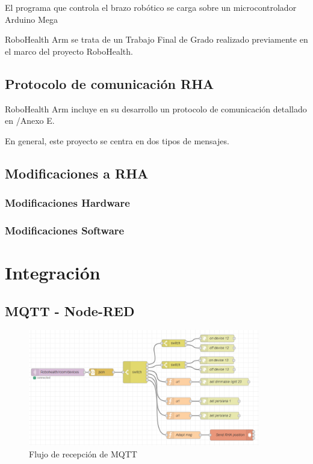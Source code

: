 El programa que controla el brazo robótico\cite{Heredia2:2018} se carga sobre un microcontrolador Arduino Mega

RoboHealth Arm se trata de un Trabajo Final de Grado\cite{Heredia1:2018} realizado previamente en el marco del proyecto RoboHealth.

\subsection{Protocolo de comunicación RHA}

RoboHealth Arm incluye en su desarrollo un protocolo de comunicación detallado en \cite{Heredia1:2018}/Anexo E.

En general, este proyecto se centra en dos tipos de mensajes.

\subsection{Modificaciones a RHA}

\subsubsection{Modificaciones Hardware}

\subsubsection{Modificaciones Software}


\section{Integración}

\subsection{MQTT - Node-RED}

\begin{figure}[H]
\centering
\includegraphics[width=0.9\textwidth]{figuras/MQTTFlow.png}
\caption{Flujo de recepción de MQTT}
\label{fig:MQTTFlow}
\end{figure}

